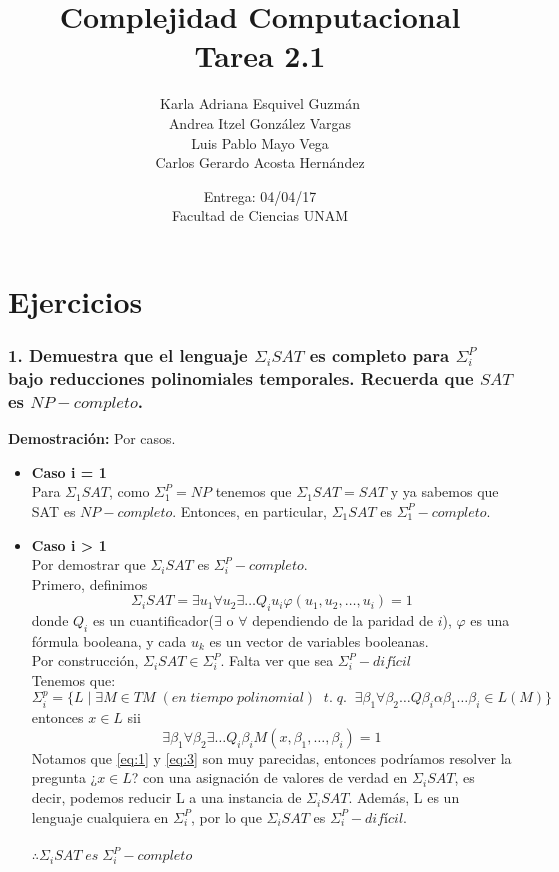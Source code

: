 \documentclass[12pt]{article}
\title{Complejidad Computacional \\ Tarea 2.1}
\author{Karla Adriana Esquivel Guzmán \\ Andrea Itzel González Vargas\\ Luis Pablo Mayo Vega \\ Carlos Gerardo Acosta Hernández}
\date{Entrega: 04/04/17 \\ Facultad de Ciencias UNAM}
\begin{document}
\maketitle
\section*{Ejercicios}
\subsubsection*{1. Demuestra que el lenguaje $\Sigma _iSAT$ es completo para $\Sigma ^P_i$ bajo reducciones polinomiales
temporales. Recuerda que $SAT$ es $NP-completo$.}
\textbf{Demostración:} Por casos.
\begin{itemize}
\item \textbf{Caso i = 1}\\ Para $\Sigma_1SAT$, como $\Sigma^P_1 = NP$ tenemos que $\Sigma _1SAT = SAT$ y ya sabemos que SAT es $NP-completo$. Entonces, en particular, $\Sigma _1SAT$ es $\Sigma^P_1-completo$. 
\item \textbf{Caso i > 1}\\ Por demostrar que $\Sigma _{i}SAT$ es $\Sigma^P_{i}-completo$.\\ 
Primero, definimos  
\begin{equation} \label{eq:1}
 \Sigma _{i}SAT = \exists u_1 \forall u_2 \exists \dots Q_{i}u_{i}\varphi(u_1,u_2,\dots,u_{i}) = 1
\end{equation}
donde $Q_{i}$ es un cuantificador($\exists$ o $\forall$ dependiendo de la paridad de $i$), $\varphi$ es una fórmula booleana, y cada $u_k$ es un vector de variables booleanas.\\
Por construcción, $\Sigma _iSAT \in \Sigma ^P_i$. Falta ver que sea $\Sigma ^P_i-difícil$\\
Tenemos que: \\
\begin{equation} \label{eq:2}
\Sigma^p_{i} = \{ L \;|\; \exists M \in TM \;(en\;tiempo\;polinomial)\;\;t.\;q.\;\; \exists \beta _1 \forall \beta _2 \dots Q\beta _{i}\alpha \beta _1 \dots \beta _{i} \in L(M)\}
\end{equation}
entonces $x \in L$ sii
\begin{equation} \label{eq:3}
 \exists \beta _1 \forall \beta _2 \exists \dots Q_i \beta _i M(x, \beta _1, \dots , \beta _i) = 1
\end{equation}
Notamos que \ref{eq:1} y \ref{eq:3} son muy parecidas, entonces podríamos resolver la pregunta ¿$x \in L$? con una asignación de valores de verdad en $\Sigma _iSAT$, es decir, podemos reducir L a una instancia de $\Sigma _iSAT$. Además, L es un lenguaje cualquiera en $\Sigma ^P_i$, por lo que $\Sigma _iSAT$ es $\Sigma ^P_i - difícil$. \\
\\$\therefore \Sigma _iSAT \;es\; \Sigma ^P_i-completo$
\end{itemize}
\end{document}
